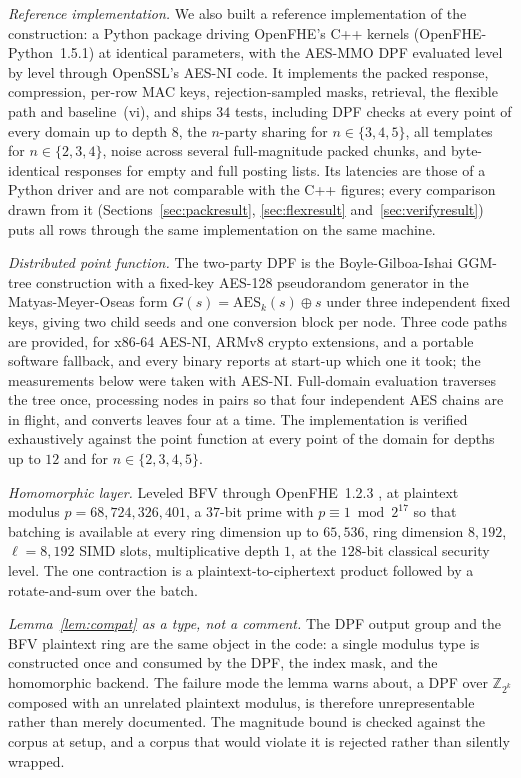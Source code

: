\documentclass[a4paper,fleqn]{cas-sc}
\begin{document}
\emph{Reference implementation.} We also built a reference
implementation of the construction: a
Python package driving OpenFHE's C++ kernels (OpenFHE-Python~1.5.1) at
identical parameters, with the AES-MMO DPF evaluated level by level through
OpenSSL's AES-NI code. It implements the packed response, compression,
per-row MAC keys, rejection-sampled masks, retrieval, the flexible path and
baseline~(vi), and ships $34$ tests, including DPF checks at every point of
every domain up to depth $8$, the $n$-party sharing for $n\in\{3,4,5\}$, all
templates for $n\in\{2,3,4\}$, noise across several full-magnitude packed
chunks, and byte-identical responses for empty and full posting lists. Its
latencies are those of a Python driver and are not comparable with the C++
figures; every comparison drawn from it (Sections~\ref{sec:packresult},
\ref{sec:flexresult} and~\ref{sec:verifyresult}) puts all rows through the
same implementation on the same machine.

\emph{Distributed point function.} The two-party DPF is the
Boyle-Gilboa-Ishai GGM-tree construction with a fixed-key AES-128
pseudorandom generator in the Matyas-Meyer-Oseas form
$G(s)=\mathrm{AES}_k(s)\oplus s$ under three independent fixed keys, giving
two child seeds and one conversion block per node. Three code paths are
provided, for x86-64 AES-NI, ARMv8 crypto extensions, and a portable
software fallback, and every binary reports at start-up which one it took; the
measurements below were taken with AES-NI. Full-domain evaluation traverses
the tree once, processing nodes in pairs so that four independent AES chains
are in flight, and converts leaves four at a time. The implementation is
verified exhaustively against the point function at every point of the domain
for depths up to $12$ and for $n\in\{2,3,4,5\}$.

\emph{Homomorphic layer.} Leveled BFV through OpenFHE~1.2.3
\citep{openfhe}, at plaintext modulus $p=68{,}724{,}326{,}401$, a $37$-bit
prime with $p\equiv 1 \bmod 2^{17}$ so that batching is available at every
ring dimension up to $65{,}536$, ring dimension $8{,}192$, $\ell=8{,}192$ SIMD
slots, multiplicative depth $1$, at the $128$-bit classical security level.
The one contraction is a plaintext-to-ciphertext product followed by a
rotate-and-sum over the batch.

\emph{Lemma~\ref{lem:compat} as a type, not a comment.} The DPF output group
and the BFV plaintext ring are the same object in the code: a single modulus
type is constructed once and consumed by the DPF, the index mask, and the
homomorphic backend. The failure mode the lemma warns about, a DPF over
$\mathbb{Z}_{2^k}$ composed with an unrelated plaintext modulus, is therefore
unrepresentable rather than merely documented. The magnitude bound is checked
against the corpus at setup, and a corpus that would violate it is rejected
rather than silently wrapped.
\end{document}
